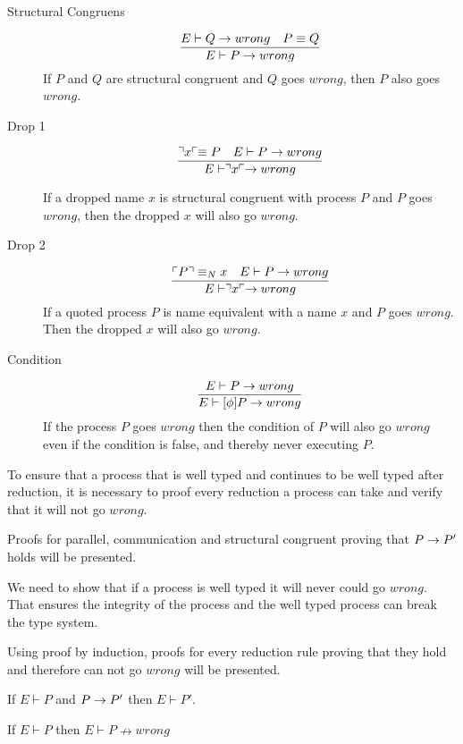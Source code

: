 \begin{description}
    \item[Structural Congruens] \begin{align*}
        \frac{E \vdash Q \rightarrow wrong \quad P \equiv Q}{E \vdash P \rightarrow wrong}
    \end{align*}
    If $P$ and $Q$ are structural congruent and $Q$ goes $wrong$, then $P$ also goes $wrong$.\\

    \item[Drop 1]\begin{align*}
        \frac{\urcorner x \ulcorner \equiv P \quad E \vdash P \rightarrow wrong}{E \vdash \urcorner x \ulcorner \rightarrow wrong}
    \end{align*}
    
    If a dropped name $x$ is structural congruent with process $P$ and $P$ goes $wrong$, then the dropped $x$ will also go $wrong$.\\

    \item[Drop 2]\begin{align*}
        \frac{\ulcorner P \urcorner \equiv _N x \quad E \vdash P \rightarrow wrong}{E \vdash \urcorner x \ulcorner \rightarrow wrong}
    \end{align*}
    If a quoted process $P$ is name equivalent with a name $x$ and $P$ goes $wrong$. Then the dropped $x$ will also go $wrong$.\\

    \item[Condition]\begin{align*}
        \frac{E \vdash P \rightarrow wrong}{E \vdash [\phi]P \rightarrow wrong}
    \end{align*}
    If the process $P$ goes $wrong$ then the condition of $P$ will also go $wrong$ even if the condition is false, and thereby never executing $P$.
\end{description}


    To ensure that a process that is well typed and continues to be well typed after reduction, it is necessary to proof every reduction a process can take and verify that it will not go $wrong$.

    Proofs for parallel, communication and structural congruent proving that $P \rightarrow P'$ holds will be presented.\\
\newpage

We need to show that if a process is well typed it will never could go $wrong$. That ensures the integrity of the process and the well typed process can break the type system.

Using proof by induction, proofs for every reduction rule proving that they hold and therefore can not go $wrong$ will be presented.
\begin{theorem}
	If $E \vdash P$ and $P\rightarrow P'$ then $E \vdash P'$.
\end{theorem}
\begin{theorem}
	If $E \vdash P$ then $E \vdash P \nrightarrow wrong$
\end{theorem}
